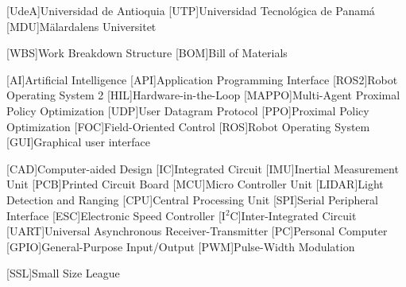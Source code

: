 
[UdeA]{Universidad de Antioquia}
[UTP]{Universidad Tecnológica de Panamá}
[MDU]{Mälardalens Universitet}

[WBS]{Work Breakdown Structure}
[BOM]{Bill of Materials}

[AI]{Artificial Intelligence}
[API]{Application Programming Interface}
[ROS2]{Robot Operating System 2}
[HIL]{Hardware-in-the-Loop}
[MAPPO]{Multi-Agent Proximal Policy Optimization}
[UDP]{User Datagram Protocol}
[PPO]{Proximal Policy Optimization}
[FOC]{Field-Oriented Control}
[ROS]{Robot Operating System}
[GUI]{Graphical user interface}

[CAD]{Computer-aided Design}
[IC]{Integrated Circuit}
[IMU]{Inertial Measurement Unit}
[PCB]{Printed Circuit Board}
[MCU]{Micro Controller Unit}
[LIDAR]{Light Detection and Ranging}
[CPU]{Central Processing Unit}
[SPI]{Serial Peripheral Interface}
[ESC]{Electronic Speed Controller}
[I$^2$C]{Inter-Integrated Circuit}
[UART]{Universal Asynchronous Receiver-Transmitter}
[PC]{Personal Computer}
[GPIO]{General-Purpose Input/Output}
[PWM]{Pulse-Width Modulation}

[SSL]{Small Size League}



